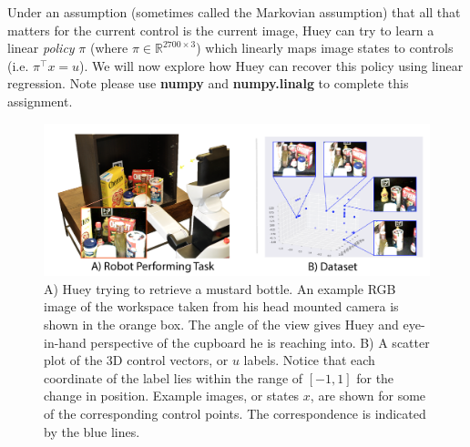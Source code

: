 \documentclass{article}\usepackage[utf8]{inputenc}\usepackage[margin=0.4cm,top=0.4cm,bottom=0.4cm]{geometry}\usepackage[usenames,dvipsnames,svgnames,table]{xcolor}
\begin{document}
\noindent Under an assumption (sometimes called the Markovian assumption) that all that matters for the current control is the current image, Huey can try to learn a linear \emph{policy} $\pi$ (where $\pi \in \mathbb{R}^{2700\times 3}$) which linearly maps image states to controls (i.e. $\pi^\top x =u$). We will now explore how Huey can recover this policy using linear regression. Note please use {\bf numpy} and {\bf numpy.linalg} to complete this assignment. 
\vspace{4pt}

\noindent \begin{figure}[h!] \begin{center} \includegraphics[scale=.4]{AB} \caption{A) Huey trying to retrieve a mustard bottle. An example RGB image of the workspace taken from his head mounted camera is shown in the orange box. The angle of the view gives Huey and eye-in-hand perspective of the cupboard he is reaching into. B) A scatter plot of the 3D control vectors, or $u$ labels. Notice that each coordinate of the label lies within the range of $[-1,1]$ for the change in position. Example images, or states $x$, are shown for some of the corresponding control points. The correspondence is indicated by the blue lines.  } \label{fig:robot}\end{center}\end{figure}
\end{document}
